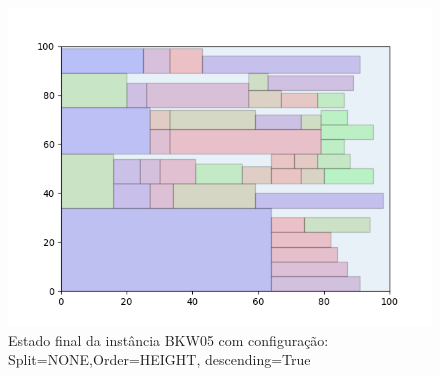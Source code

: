 \begin{figure}[H]
    \centering
    \caption[]{Estado final da instância BKW05 com configuração: Split=NONE,Order=HEIGHT, descending=True}
    \label{fig:bkw05-none-height-true}
    \includegraphics[scale=0.5]{output/figures/bkw/bkw05/none/height/true/00}
\end{figure}